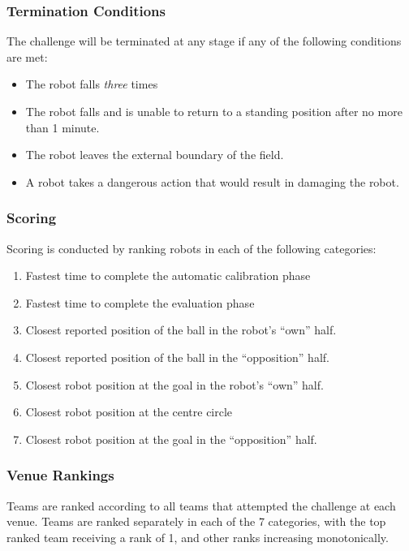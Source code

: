 \subsubsection{Termination Conditions}

The challenge will be terminated at any stage if any of the following conditions are met:
\begin{itemize}
    \item The robot falls \textit{three} times
    \item The robot falls and is unable to return to a standing position after no more than 1 minute.
    \item The robot leaves the external boundary of the field.
    \item A robot takes a dangerous action that would result in damaging the robot. %
\end{itemize}

\subsubsection{Scoring}

Scoring is conducted by ranking robots in each of the following categories:
\begin{enumerate}
    \item Fastest time to complete the automatic calibration phase
    \item Fastest time to complete the evaluation phase
    \item Closest reported position of the ball in the robot's ``own'' half.
    \item Closest reported position of the ball in the ``opposition'' half.
    \item Closest robot position at the goal in the robot's ``own'' half.
    \item Closest robot position at the centre circle
    \item Closest robot position at the goal in the ``opposition'' half.
\end{enumerate} 

\subsubsection{Venue Rankings}
Teams are ranked according to all teams that attempted the challenge at each venue. Teams are ranked separately in each of the 7 categories, with the top ranked team receiving a rank of 1, and other ranks increasing monotonically.

